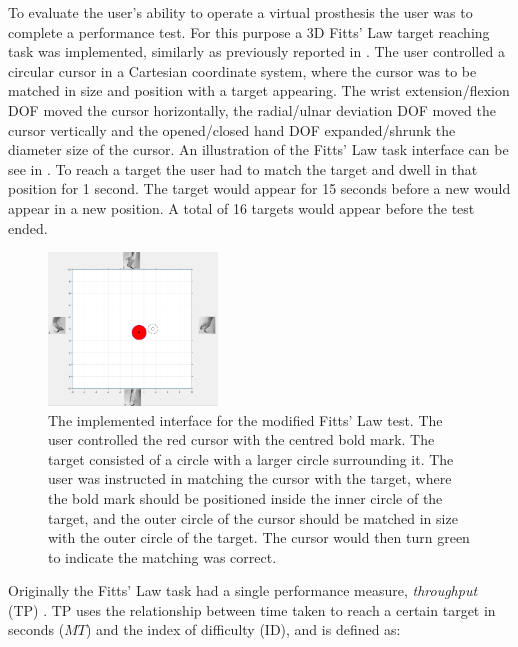 To evaluate the user's ability to operate a virtual prosthesis the user was to complete a performance test. For this purpose a 3D Fitts' Law target reaching task was implemented, similarly as previously reported in \cite{Scheme2013, Scheme2013a}. The user controlled a circular cursor in a Cartesian coordinate system, where the cursor was to be matched in size and position with a target appearing. The wrist extension/flexion DOF moved the cursor horizontally, the radial/ulnar deviation DOF moved the cursor vertically and the opened/closed hand DOF expanded/shrunk the diameter size of the cursor. An illustration of the Fitts' Law task interface can be see in \figref{}. To reach a target the user had to match the target and dwell in that position for 1 second. The target would appear for 15 seconds before a new would appear in a new position. A total of 16 targets would appear before the test ended. \\

\begin{figure}[H] 
	\includegraphics[width=0.4\textwidth]{figures/Paper/perftestGUI}
	\caption{The implemented interface for the modified Fitts' Law test. The user controlled the red cursor with the centred bold mark. The target consisted of a circle with a larger circle surrounding it. The user was instructed in matching the cursor with the target, where the bold mark should be positioned inside the inner circle of the target, and the outer circle of the cursor should be matched in size with the outer circle of the target. The cursor would then turn green to indicate the matching was correct.}
	\label{fig:fittsLawTask}
\end{figure}

Originally the Fitts' Law task had a single performance measure, \textit{throughput} (TP) \cite{Fitts1954}. TP uses the relationship between time taken to reach a certain target in seconds ($MT$) and the index of difficulty (ID), and is defined as:

